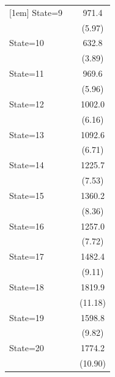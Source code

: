 \documentclass{article}
\begin{document}
{\begin{longtable}{l*{2}{c}}
[1em]
State=9             &                     &       971.4\sym{***}\\
                    &                     &      (5.97)         \\
[1em]
State=10            &                     &       632.8\sym{***}\\
                    &                     &      (3.89)         \\
[1em]
State=11            &                     &       969.6\sym{***}\\
                    &                     &      (5.96)         \\
[1em]
State=12            &                     &      1002.0\sym{***}\\
                    &                     &      (6.16)         \\
[1em]
State=13            &                     &      1092.6\sym{***}\\
                    &                     &      (6.71)         \\
[1em]
State=14            &                     &      1225.7\sym{***}\\
                    &                     &      (7.53)         \\
[1em]
State=15            &                     &      1360.2\sym{***}\\
                    &                     &      (8.36)         \\
[1em]
State=16            &                     &      1257.0\sym{***}\\
                    &                     &      (7.72)         \\
[1em]
State=17            &                     &      1482.4\sym{***}\\
                    &                     &      (9.11)         \\
[1em]
State=18            &                     &      1819.9\sym{***}\\
                    &                     &     (11.18)         \\
[1em]
State=19            &                     &      1598.8\sym{***}\\
                    &                     &      (9.82)         \\
[1em]
State=20            &                     &      1774.2\sym{***}\\
                    &                     &     (10.90)         \\

\end{longtable}}
\end{document}
